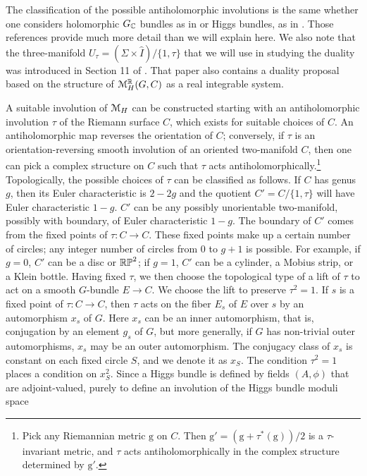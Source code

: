 \documentclass[11pt,a4paper]{article}
\begin{document}
The classification of the possible antiholomorphic involutions is the same whether one considers holomorphic $G_\C$ bundles as in \cite{Hurtu,Hurtu2}
or Higgs bundles, as in 
 \cite{BaSc,BaSc2,BG}.   Those references provide much more detail than we will explain here.   We also note that 
 the three-manifold $U_\tau=(\Sigma\times \hat I)/\{1,\tau\}$ that we will use in studying the duality was  introduced in Section 11 of \cite{BaSc}.  That paper also contains a duality proposal based on the structure of $\M_H^\R(G,C)$ as a real integrable system.   

A suitable involution of $\M_H$ can be constructed starting with an antiholomorphic involution $\tau$ of the Riemann surface $C$, which exists
for suitable choices of $C$.    An antiholomorphic map reverses
the orientation of $C$; conversely, if $\tau$ is an orientation-reversing smooth involution of an oriented two-manifold $C$, then one can pick a complex
structure on $C$ such that $\tau$ acts antiholomorphically.\footnote{Pick any Riemannian metric $\mathrm g$ on $C$.   Then $\mathrm g'
=({\mathrm g}+\tau^*({\mathrm g}))/2$ is  a $\tau$-invariant metric, and $\tau$ acts antiholomorphically in the complex structure determined by $\mathrm g'$.}
Topologically, the  possible choices of $\tau$ can be classified as follows.  If $C$ has genus $g$, then its Euler characteristic
is $2-2g$ and the quotient $C'=C/\{1,\tau\}$ will have Euler characteristic $1-g$.  $C'$ can be any possibly unorientable two-manifold, possibly with boundary,
of Euler characteristic $1-g$.  The boundary of $C'$ comes from the fixed points of $\tau:C\to C$.  These fixed points make up a certain number of circles;
any integer number of circles from $0$ to $g+1$ is possible.
For example, if $g=0$, $C'$ can be a disc or $\Bbb{RP}^2$; if $g=1$, $C'$ can be a cylinder, a Mobius strip, or a Klein bottle. 
Having fixed $\tau$, we then choose the topological type of a lift of $\tau$ to act on a smooth $G$-bundle $E\to C$.   We choose the lift
to preserve $\tau^2=1$.   If $s$ is a fixed point of $\tau:C\to C$,  then $\tau$ acts on the fiber $E_s$ of $E$ over $s$
by an automorphism $x_s$ of $G$.   Here $x_s$ can be an inner automorphism, that is, conjugation by an element $g_s$ of $G$,
but more generally, if $G$ has non-trivial outer automorphisms, $x_s$ may be an outer automorphism.
The conjugacy class of $x_s$ is constant on each fixed circle $S$, and we denote it as $x_S$.
  The condition  $\tau^2=1$ places a condition on $x_S^2$.
Since a Higgs bundle is defined by fields $(A,\phi)$ that are adjoint-valued, purely to define an involution of the Higgs bundle moduli space
\end{document}

